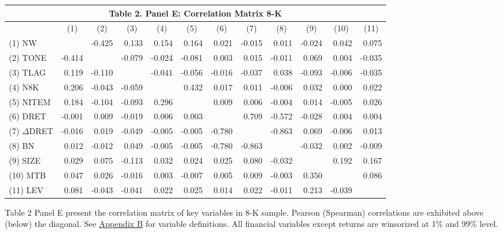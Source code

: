 \begin{table}[H] \label{T2PE}
  \begin{center}
  	\begin{tabular}{lrrrrrrrrrrr}
  		\multicolumn{12}{c}{\textbf{Table 2. Panel E: Correlation Matrix 8-K}} \\
  		\midrule
  		\midrule
  		& \multicolumn{1}{c}{(1)} & \multicolumn{1}{c}{(2)} & \multicolumn{1}{c}{(3)} & \multicolumn{1}{c}{(4)} & \multicolumn{1}{c}{(5)} & \multicolumn{1}{c}{(6)} & \multicolumn{1}{c}{(7)} & \multicolumn{1}{c}{(8)} & \multicolumn{1}{c}{(9)} & \multicolumn{1}{c}{(10)} & \multicolumn{1}{c}{(11)} \\
  		\midrule
  		(1) NW & & -0.425 & 0.133 & 0.154 & 0.164 & 0.021 & -0.015 & 0.011 & -0.024 & 0.042 & 0.075 \\
  		(2) TONE & -0.414 & & -0.079 & -0.024 & -0.081 & 0.003 & 0.015 & -0.011 & 0.069 & 0.004 & -0.035 \\
  		(3) TLAG & 0.119 & -0.110 & & -0.041 & -0.056 & -0.016 & -0.037 & 0.038 & -0.093 & -0.006 & -0.035 \\
  		(4) N8K & 0.206 & -0.043 & -0.059 & & 0.432 & 0.017 & 0.011 & -0.006 & 0.032 & 0.000 & 0.022 \\
  		(5) NITEM & 0.184 & -0.104 & -0.093 & 0.296 & & 0.009 & 0.006 & -0.004 & 0.014 & -0.005 & 0.026 \\
  		(6) DRET & -0.001 & 0.009 & -0.019 & 0.006 & 0.003 & & 0.709 & -0.572 & -0.028 & 0.004 & 0.004 \\
  		(7) $\Delta$DRET & -0.016 & 0.019 & -0.049 & -0.005 & -0.005 & -0.780 & & -0.863 & 0.069 & -0.006 & 0.013 \\
  		(8) BN & 0.012 & -0.012 & 0.049 & -0.005 & -0.005 & -0.780 & -0.863 & & -0.032 & 0.002 & -0.009 \\
  		(9) SIZE & 0.029 & 0.075 & -0.113 & 0.032 & 0.024 & 0.025 & 0.080 & -0.032 & & 0.192 & 0.167 \\
  		(10) MTB & 0.047 & 0.026 & -0.016 & 0.003 & -0.007 & 0.005 & 0.009 & -0.003 & 0.350 & & 0.086 \\
  		(11) LEV & 0.081 & -0.043 & -0.041 & 0.022 & 0.025 & 0.014 & 0.022 & -0.011 & 0.213 & -0.039 & \\
  		\bottomrule
  		\bottomrule
  	\end{tabular}%
  \end{center}
	\begin{footnotesize}
		\noindent Table 2 Panel E present the correlation matrix of key variables in 8-K sample. Pearson (Spearman) correlations are exhibited above (below) the diagonal. See \hyperref[appb]{Appendix B} for variable definitions. All financial variables except returns are winsorized at 1\% and 99\% level. 
	\end{footnotesize}
\end{table}%
